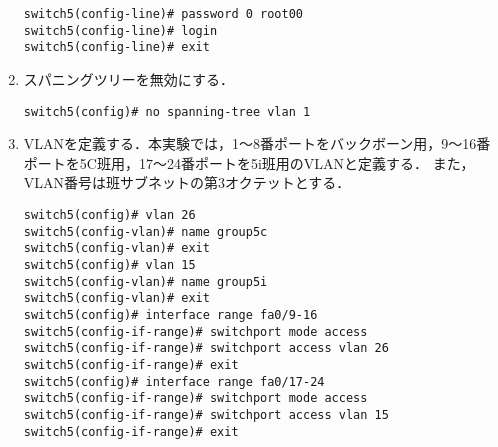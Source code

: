 \begin{enumerate}
\begin{lstlisting}
switch5(config-line)# password 0 root00
switch5(config-line)# login
switch5(config-line)# exit
\end{lstlisting}
    \item スパニングツリーを無効にする．
          \begin{lstlisting}
switch5(config)# no spanning-tree vlan 1
    \end{lstlisting}
    \item VLANを定義する．本実験では，1〜8番ポートをバックボーン用，9〜16番ポートを5C班用，17〜24番ポートを5i班用のVLANと定義する．
          また，VLAN番号は班サブネットの第3オクテットとする．
          \begin{lstlisting}
switch5(config)# vlan 26
switch5(config-vlan)# name group5c
switch5(config-vlan)# exit
switch5(config)# vlan 15
switch5(config-vlan)# name group5i
switch5(config-vlan)# exit
switch5(config)# interface range fa0/9-16
switch5(config-if-range)# switchport mode access
switch5(config-if-range)# switchport access vlan 26
switch5(config-if-range)# exit
switch5(config)# interface range fa0/17-24
switch5(config-if-range)# switchport mode access
switch5(config-if-range)# switchport access vlan 15
switch5(config-if-range)# exit
\end{lstlisting}
\end{enumerate}
